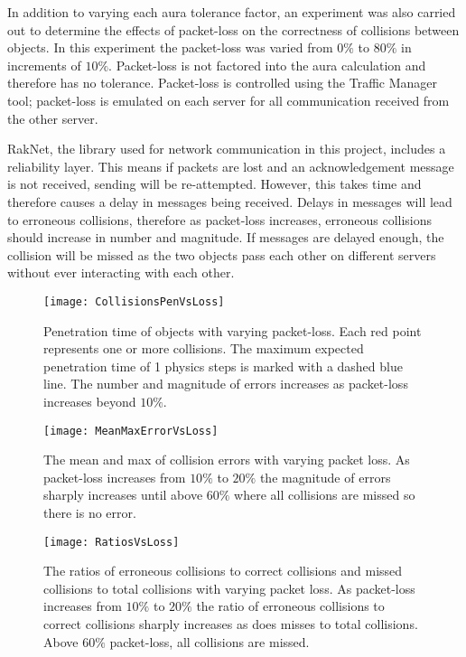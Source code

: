 In addition to varying each aura tolerance factor, an experiment was also carried out to determine the effects of packet-loss on the correctness of collisions between objects. In this experiment the packet-loss was varied from $0\%$ to $80\%$ in increments of $10\%$. Packet-loss is not factored into the aura calculation and therefore has no tolerance. Packet-loss is controlled using the Traffic Manager tool; packet-loss is emulated on each server for all communication received from the other server.

RakNet, the library used for network communication in this project, includes a reliability layer. This means if packets are lost and an acknowledgement message is not received, sending will be re-attempted. However, this takes time and therefore causes a delay in messages being received. Delays in messages will lead to erroneous collisions, therefore as packet-loss increases, erroneous collisions should increase in number and magnitude. If messages are delayed enough, the collision will be missed as the two objects pass each other on different servers without ever interacting with each other. 


\begin{figure}
\centering
\texttt{[image: CollisionsPenVsLoss]}
\caption{Penetration time of objects with varying packet-loss. Each red point represents one or more collisions. The maximum expected penetration time of 1 physics steps is marked with a dashed blue line. The number and magnitude of errors increases as packet-loss increases beyond $10\%$.}
\label{fig_CollisionsPenVsLoss}
\end{figure}

\begin{figure}
\centering
\texttt{[image: MeanMaxErrorVsLoss]}
\caption{The mean and max of collision errors with varying packet loss. As packet-loss increases from $10\%$ to $20\%$ the magnitude of errors sharply increases until above $60\%$ where all collisions are missed so there is no error.}
\label{fig_MeanMaxErrorVsLoss}
\end{figure}

\begin{figure}
\centering
\texttt{[image: RatiosVsLoss]}
\caption{The ratios of erroneous collisions to correct collisions and missed collisions to total collisions with varying packet loss. As packet-loss increases from $10\%$ to $20\%$ the ratio of erroneous collisions to correct collisions sharply increases as does misses to total collisions. Above $60\%$ packet-loss, all collisions are missed.}
\label{fig_RatiosVsLoss}
\end{figure}

